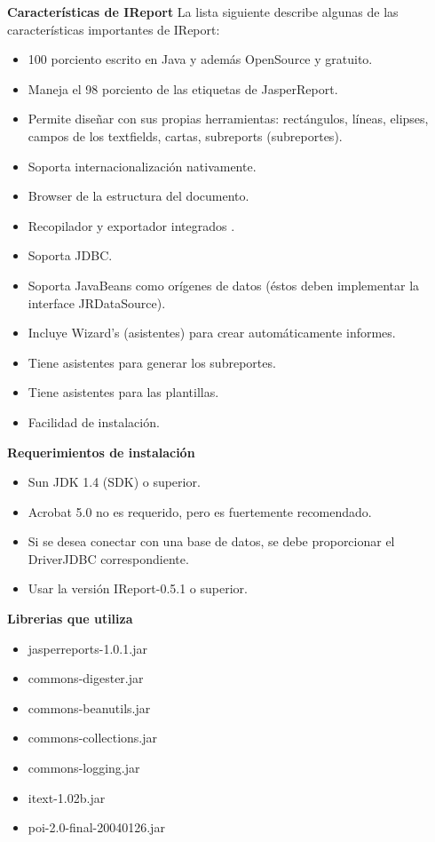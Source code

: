 		\textbf{Características de IReport}
		La lista siguiente describe algunas de las características importantes de IReport:
		\begin{itemize}
			\item 100 porciento escrito en Java y además OpenSource y gratuito.
			\item Maneja el 98 porciento de las etiquetas de JasperReport.
			\item Permite diseñar con sus propias herramientas: rectángulos, líneas, elipses, campos de los textfields, cartas, subreports (subreportes).
			\item Soporta internacionalización nativamente.
			\item Browser de la estructura del documento.
			\item Recopilador y exportador integrados .
			\item Soporta JDBC.
			\item Soporta JavaBeans como orígenes de datos (éstos deben implementar la interface JRDataSource).
			\item Incluye Wizard’s (asistentes) para crear automáticamente informes.
			\item Tiene asistentes para generar los subreportes.
			\item Tiene asistentes para las plantillas.
			\item Facilidad de instalación.
		\end{itemize}
		
		\textbf{Requerimientos de instalación}
		\begin{itemize}
			\item Sun JDK 1.4 (SDK) o superior.
			\item Acrobat 5.0 no es requerido, pero es fuertemente recomendado.
			\item Si se desea conectar con una base de datos, se debe proporcionar el DriverJDBC correspondiente.
			\item Usar la versión IReport-0.5.1 o superior.
		\end{itemize}
		
		\textbf{Librerias que utiliza}
		\begin{itemize}
			\item jasperreports-1.0.1.jar
			\item commons-digester.jar
			\item commons-beanutils.jar
			\item commons-collections.jar
			\item commons-logging.jar
			\item itext-1.02b.jar
			\item poi-2.0-final-20040126.jar
		\end{itemize}

